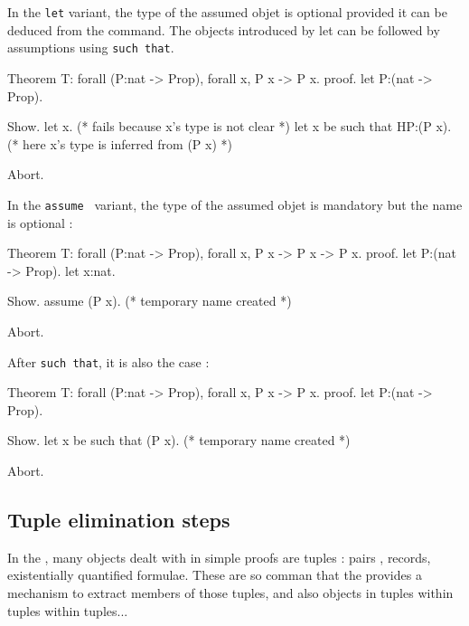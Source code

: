 In the {\tt let} variant, the type of the assumed objet is optional
provided it can be deduced from the command. The objects introduced by
let can be followed by assumptions using {\tt such that}.

\begin{coq_eval}
Theorem T: forall (P:nat -> Prop), forall x, P x -> P x.
proof.
let P:(nat -> Prop).
\end{coq_eval} 
\begin{coq_example}
Show.
let x. (* fails because x's type is not clear *) 
let x be such that HP:(P x). (* here x's type is inferred from (P x) *)
\end{coq_example}
\begin{coq_eval}
Abort.
\end{coq_eval}

In the {\tt assume } variant, the type of the assumed objet is mandatory but the name is optional :

\begin{coq_eval}
Theorem T: forall (P:nat -> Prop), forall x, P x -> P x -> P x.
proof.
let P:(nat -> Prop).
let x:nat.
\end{coq_eval} 
\begin{coq_example}
Show.
assume (P x). (* temporary name created *)
\end{coq_example}
\begin{coq_eval}
Abort.
\end{coq_eval}

After {\tt such that}, it is also the case :

\begin{coq_eval}
Theorem T: forall (P:nat -> Prop), forall x, P x -> P x.
proof.
let P:(nat -> Prop).
\end{coq_eval} 
\begin{coq_example}
Show.
let x be such that (P x). (* temporary name created *)
\end{coq_example}
\begin{coq_eval}
Abort.
\end{coq_eval}

\subsection{Tuple elimination steps}

In the \CIC, many objects dealt with in simple proofs are tuples :
pairs , records, existentially quantified formulae. These are so
comman that the \DPL{} provides a mechanism to extract members of
those tuples, and also objects in tuples within tuples within
tuples...

